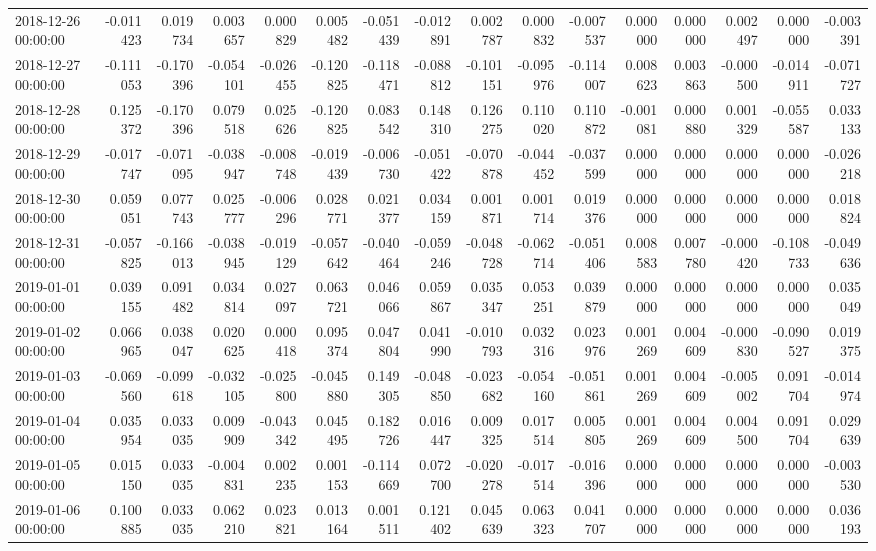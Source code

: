 \begin{tabular}{lrrrrrrrrrrrrrrr}
2018-12-26 00:00:00 & -0.011423 & 0.019734 & 0.003657 & 0.000829 & 0.005482 & -0.051439 & -0.012891 & 0.002787 & 0.000832 & -0.007537 & 0.000000 & 0.000000 & 0.002497 & 0.000000 & -0.003391 \\
2018-12-27 00:00:00 & -0.111053 & -0.170396 & -0.054101 & -0.026455 & -0.120825 & -0.118471 & -0.088812 & -0.101151 & -0.095976 & -0.114007 & 0.008623 & 0.003863 & -0.000500 & -0.014911 & -0.071727 \\
2018-12-28 00:00:00 & 0.125372 & -0.170396 & 0.079518 & 0.025626 & -0.120825 & 0.083542 & 0.148310 & 0.126275 & 0.110020 & 0.110872 & -0.001081 & 0.000880 & 0.001329 & -0.055587 & 0.033133 \\
2018-12-29 00:00:00 & -0.017747 & -0.071095 & -0.038947 & -0.008748 & -0.019439 & -0.006730 & -0.051422 & -0.070878 & -0.044452 & -0.037599 & 0.000000 & 0.000000 & 0.000000 & 0.000000 & -0.026218 \\
2018-12-30 00:00:00 & 0.059051 & 0.077743 & 0.025777 & -0.006296 & 0.028771 & 0.021377 & 0.034159 & 0.001871 & 0.001714 & 0.019376 & 0.000000 & 0.000000 & 0.000000 & 0.000000 & 0.018824 \\
2018-12-31 00:00:00 & -0.057825 & -0.166013 & -0.038945 & -0.019129 & -0.057642 & -0.040464 & -0.059246 & -0.048728 & -0.062714 & -0.051406 & 0.008583 & 0.007780 & -0.000420 & -0.108733 & -0.049636 \\
2019-01-01 00:00:00 & 0.039155 & 0.091482 & 0.034814 & 0.027097 & 0.063721 & 0.046066 & 0.059867 & 0.035347 & 0.053251 & 0.039879 & 0.000000 & 0.000000 & 0.000000 & 0.000000 & 0.035049 \\
2019-01-02 00:00:00 & 0.066965 & 0.038047 & 0.020625 & 0.000418 & 0.095374 & 0.047804 & 0.041990 & -0.010793 & 0.032316 & 0.023976 & 0.001269 & 0.004609 & -0.000830 & -0.090527 & 0.019375 \\
2019-01-03 00:00:00 & -0.069560 & -0.099618 & -0.032105 & -0.025800 & -0.045880 & 0.149305 & -0.048850 & -0.023682 & -0.054160 & -0.051861 & 0.001269 & 0.004609 & -0.005002 & 0.091704 & -0.014974 \\
2019-01-04 00:00:00 & 0.035954 & 0.033035 & 0.009909 & -0.043342 & 0.045495 & 0.182726 & 0.016447 & 0.009325 & 0.017514 & 0.005805 & 0.001269 & 0.004609 & 0.004500 & 0.091704 & 0.029639 \\
2019-01-05 00:00:00 & 0.015150 & 0.033035 & -0.004831 & 0.002235 & 0.001153 & -0.114669 & 0.072700 & -0.020278 & -0.017514 & -0.016396 & 0.000000 & 0.000000 & 0.000000 & 0.000000 & -0.003530 \\
2019-01-06 00:00:00 & 0.100885 & 0.033035 & 0.062210 & 0.023821 & 0.013164 & 0.001511 & 0.121402 & 0.045639 & 0.063323 & 0.041707 & 0.000000 & 0.000000 & 0.000000 & 0.000000 & 0.036193 \\

\end{tabular}

